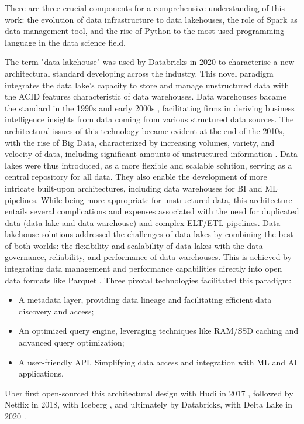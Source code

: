 There are three crucial components for a comprehensive understanding of this work: the evolution of data infrastructure to data lakehouses, the role of Spark as data management tool, and the rise of Python to the most used programming language in the data science field.

\smallskip

The term "data lakehouse" was used by Databricks in 2020 \cite{WhatLakehouse2020} to characterise a new architectural standard developing across the industry. This novel paradigm integrates the data lake's capacity to store and manage unstructured data with the \gls{ACID} features characteristic of data warehouses.
Data warehouses bacame the standard in the 1990s and early 2000s \cite{chaudhuriOverviewDataWarehousing1997}, facilitating firms in deriving business intelligence insights from data coming from various structured data sources. The architectural issues of this technology became evident at the end of the 2010s, with the rise of Big Data, characterized by increasing volumes, variety, and velocity of data, including significant amounts of unstructured information \cite{ederUnstructuredData802008}. 
Data lakes were thus introduced, as a more flexible and scalable solution, serving as a central repository for all data. They also enable the development of more intricate built-upon architectures, including data warehouses for \gls{BI} and \gls{ML} pipelines. While being more appropriate for unstructured data, this architecture entails several complications and expenses associated with the need for duplicated data (data lake and data warehouse) and complex \gls{ELT}/\gls{ETL} pipelines.
Data lakehouse solutions addressed the challenges of data lakes  by combining the best of both worlds: the flexibility and scalability of data lakes with the data governance, reliability, and performance of data warehouses. This is achieved by integrating data management and performance capabilities directly into open data formats like Parquet \cite{DremelMadeSimple}. Three pivotal technologies facilitated this paradigm:
\begin{itemize}
    \item A metadata layer, providing data lineage and facilitating efficient data discovery and access;
    \item An optimized query engine, leveraging techniques like \gls{RAM}/\gls{SSD} caching and advanced query optimization;
    \item A user-friendly API, Simplifying data access and integration with \gls{ML} and \gls{AI} applications.
\end{itemize}
Uber first open-sourced this architectural design with Hudi in 2017 \cite{rajaperumalUberEngineeringIncremental2017}, followed by Netflix in 2018, with Iceberg \cite{IcebergExamples2024}, and ultimately by Databricks, with Delta Lake in 2020 \cite{armbrustDeltaLakeHighperformance2020}.

\smallskip



\smallskip

